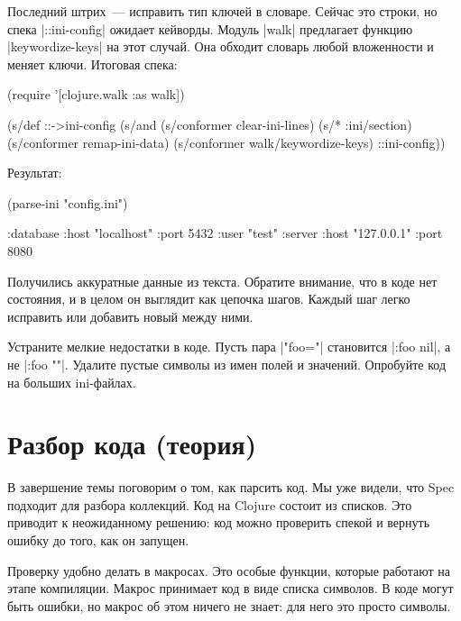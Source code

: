
Последний штрих~--- исправить тип ключей в словаре. Сейчас это строки, но спека
\spverb|::ini-config| ожидает кейворды. Модуль \spverb|walk| предлагает функцию
\spverb|keywordize-keys| на этот случай. Она обходит словарь любой вложенности и
меняет ключи. Итоговая спека:

\begin{english}
  \begin{clojure}
(require '[clojure.walk :as walk])

(s/def ::->ini-config
  (s/and
   (s/conformer clear-ini-lines)
   (s/* :ini/section)
   (s/conformer remap-ini-data)
   (s/conformer walk/keywordize-keys)
   ::ini-config))
  \end{clojure}
\end{english}

\noindent
Результат:

\begin{english}
  \begin{clojure}
(parse-ini "config.ini")

{:database {:host "localhost"
            :port 5432
            :user "test"}
 :server {:host "127.0.0.1"
          :port 8080}}
  \end{clojure}
\end{english}

Получились аккуратные данные из текста. Обратите внимание, что в коде нет
состояния, и в целом он выглядит как цепочка шагов. Каждый шаг легко исправить
или добавить новый между ними.

Устраните мелкие недостатки в коде. Пусть пара \spverb|"foo="| становится
\spverb|{:foo nil}|, а не \spverb|{:foo ""}|.  Удалите пустые символы из имен
полей и значений. Опробуйте код на больших ini-файлах.

\section{Разбор кода (теория)}


В завершение темы поговорим о том, как парсить код. Мы уже видели, что Spec
подходит для разбора коллекций. Код на Clojure состоит из списков. Это приводит
к неожиданному решению: код можно проверить спекой и вернуть ошибку до того, как
он запущен.

Проверку удобно делать в макросах. Это особые функции, которые работают на этапе
компиляции. Макрос принимает код в виде списка символов. В коде могут быть
ошибки, но макрос об этом ничего не знает: для него это просто символы.

